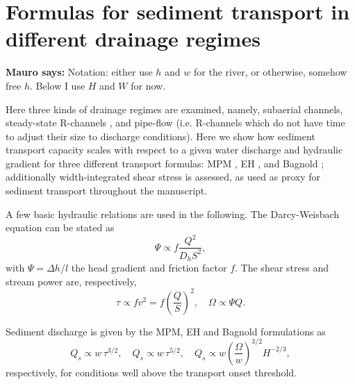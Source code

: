 \documentclass[draft]{agujournal2019}
\newcommand{\mauro}[1]{{\textbf{\color{green}Mauro says:} \color{green} #1} }
\begin{document}
\newpage
\section{Formulas for sediment transport in different drainage regimes}
\label{sect:scaling}

\mauro{Notation: either use $h$ and $w$ for the river, or otherwise, somehow free $h$. Below I use $H$ and $W$ for now.}

Here three kinds of drainage regimes are examined, namely, subaerial channels, steady-state R-channels \cite{rothlisberger1972}, and pipe-flow (i.e. R-channels which do not have time to adjust their size to discharge conditions).
Here we show how sediment transport capacity scales with respect to a given water discharge and hydraulic gradient for three different transport formulas: MPM \cite{meyer1948}, EH \cite{engelund1967}, and Bagnold \cite{bagnold1980}; additionally width-integrated shear stress is assessed, as used as proxy for sediment transport throughout the manuscript.

A few basic hydraulic relations are used in the following.
The Darcy-Weisbach equation can be stated as
\begin{equation}
  \label{eq:DW}
  \Psi \propto f\frac{Q^2}{D_h S^2},
\end{equation}
with $\Psi = \Delta h / l$ the head gradient and friction factor $f$.
The shear stress and stream power are, respectively,
\begin{equation}
    \label{eq:tau-omega}
  \tau \propto f v^2 = f \left(\frac{Q}{S}\right)^2, \quad  \Omega \propto \Psi Q.
\end{equation}
%

Sediment discharge is given by the MPM, EH and Bagnold formulations as
\begin{equation}
  Q_s \propto w\, \tau^{3/2}, \quad Q_s \propto w\, \tau^{5/2}, \quad Q_s \propto w \left(\frac{\Omega}{w}\right)^{3/2} H^{-2/3},
\end{equation}
respectively, for conditions well above the transport onset threshold.
\end{document}
